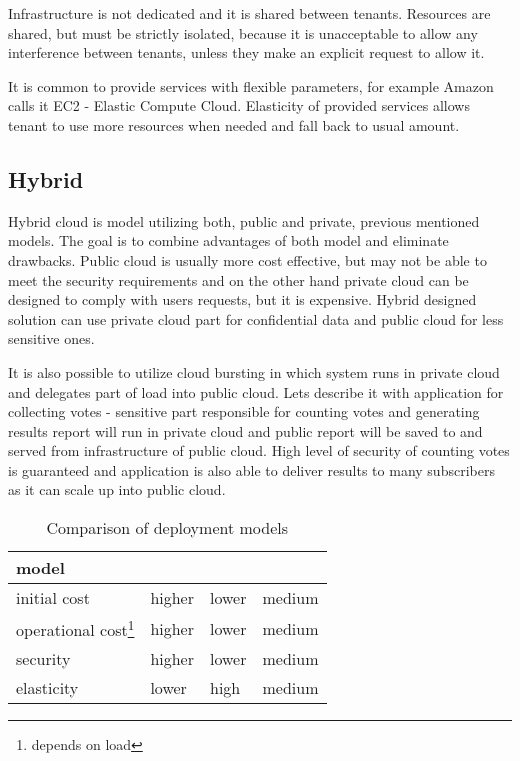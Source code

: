 Infrastructure is not dedicated and it is shared between tenants. Resources are shared, but must be strictly isolated, because it is unacceptable to allow any interference between tenants, unless they make an explicit request to allow it.

It is common to provide services with flexible parameters, for example Amazon calls it EC2 - Elastic Compute Cloud. Elasticity of provided services allows tenant to use more resources when needed and fall back to usual amount. 

\subsection{Hybrid}
Hybrid cloud is model utilizing both, public and private, previous mentioned models. The goal is to combine advantages of both model and eliminate drawbacks. Public cloud is usually more cost effective, but may not be able to meet the security requirements and on the other hand private cloud can be designed to comply with users requests, but it is expensive. Hybrid designed solution can use private cloud part for confidential data and public cloud for less sensitive ones. 

It is also possible to utilize cloud bursting in which system runs in private cloud and delegates part of load into public cloud. Lets describe it with application for collecting votes - sensitive part responsible for counting votes and generating results report will run in private cloud and public report will be saved to and served from infrastructure of public cloud. High level of security of counting votes is guaranteed and application is also able to deliver results to many subscribers as it can scale up into public cloud.





\begin{table}[htb]
\begin{center}
	\caption{Comparison of deployment models}
	\label{tab:deployment-models}
	\begin{tabularx}{\textwidth}{|X|X|X|X|}
	\hline
	model & \Th{private} & \Th{public} & \Th{hybrid} \\
	\hline
	initial cost & higher & lower & medium \\
	\hline
	operational cost\footnote{depends on load} & higher & lower & medium \\
	\hline
	security & higher & lower & medium \\
	\hline
	elasticity & lower & high & medium \\
	\hline
	\end{tabularx}
\end{center}
\end{table}

